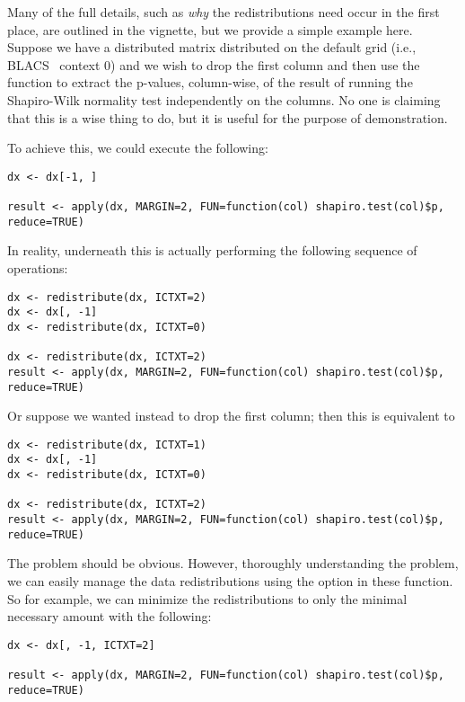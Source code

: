Many of the full details, such as \emph{why} the redistributions need occur in the first place, are outlined in the  vignette, but we provide a simple example here.  Suppose we have a distributed matrix  distributed on the default grid (i.e., BLACS~ context 0) and we wish to drop the first column and then use the  function to extract the p-values, column-wise, of the result of running the Shapiro-Wilk normality test independently on the columns.  No one is claiming that this is a wise thing to do, but it is useful for the purpose of demonstration.

To achieve this, we could execute the following:

\begin{lstlisting}[language=rr,title=Implicit Redistributions]
dx <- dx[-1, ]

result <- apply(dx, MARGIN=2, FUN=function(col) shapiro.test(col)$p, reduce=TRUE)
\end{lstlisting}

In reality, underneath this is actually performing the following sequence of operations:

\begin{lstlisting}[language=rr,title=Implicit Redistributions]
dx <- redistribute(dx, ICTXT=2)
dx <- dx[, -1]
dx <- redistribute(dx, ICTXT=0)

dx <- redistribute(dx, ICTXT=2)
result <- apply(dx, MARGIN=2, FUN=function(col) shapiro.test(col)$p, reduce=TRUE)
\end{lstlisting}

Or suppose we wanted instead to drop the first column; then this is equivalent to

\begin{lstlisting}[language=rr,title=Implicit Redistributions]
dx <- redistribute(dx, ICTXT=1)
dx <- dx[, -1]
dx <- redistribute(dx, ICTXT=0)

dx <- redistribute(dx, ICTXT=2)
result <- apply(dx, MARGIN=2, FUN=function(col) shapiro.test(col)$p, reduce=TRUE)
\end{lstlisting}

The problem should be obvious.  However, thoroughly understanding the problem, we can easily manage the data redistributions using the  option in these function.  So for example, we can minimize the redistributions to only the minimal necessary amount with the following:

\begin{lstlisting}[language=rr,title=Implicit Redistributions]
dx <- dx[, -1, ICTXT=2]

result <- apply(dx, MARGIN=2, FUN=function(col) shapiro.test(col)$p, reduce=TRUE)
\end{lstlisting}

